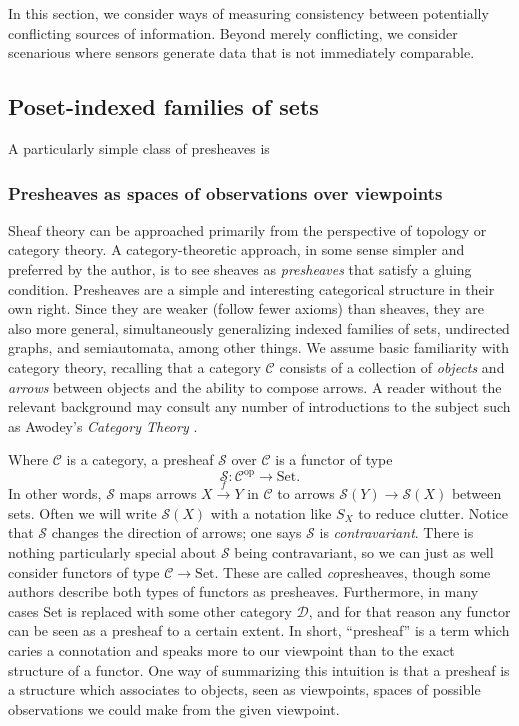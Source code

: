 In this section, we consider ways of measuring consistency between
potentially conflicting sources of information. Beyond merely
conflicting, we consider scenarious where sensors generate data that
is not immediately comparable.

\subsection{Poset-indexed families of sets}

A particularly simple class of presheaves is 



\subsubsection{Presheaves as spaces of observations over viewpoints}

Sheaf theory can be approached primarily from the perspective of topology or category theory. A category-theoretic approach, in some sense simpler and preferred by the author, is to see sheaves as \emph{presheaves} that satisfy a gluing condition. Presheaves are a simple and interesting categorical structure in their own right. Since they are weaker (follow fewer axioms) than sheaves, they are also more general, simultaneously generalizing indexed families of sets, undirected graphs, and semiautomata, among other things. We assume basic familiarity with category theory, recalling that a category $\mathcal{C}$ consists of a collection of \emph{objects} and \emph{arrows} between objects and the ability to compose arrows. A reader without the relevant background may consult any number of introductions to the subject such as Awodey's \emph{Category Theory} \cite{10.5555/2060081}.


Where $\mathcal{C}$ is a category, a presheaf $\mathcal{S}$ over $\mathcal{C}$ is a functor of type
\[ \mathcal{S}: \mathcal{C}^\textrm{op} \to \mathrm{Set}.\]
In other words, $\mathcal{S}$ maps arrows $X \xrightarrow{f} Y$ in $\mathcal{C}$ to arrows $\mathcal{S}(Y) \to \mathcal{S}(X)$ between sets.  Often we will write $\mathcal{S}(X)$ with a notation like $S_X$ to reduce clutter. Notice that $\mathcal{S}$ changes the direction of arrows; one says $\mathcal{S}$ is \emph{contravariant}. There is nothing particularly special about $\mathcal{S}$ being contravariant, so we can just as well consider functors of type $\mathcal{C} \to \mathrm{Set}$. These are called \emph{co}presheaves, though some authors describe both types of functors as presheaves.
Furthermore, in many cases $\mathrm{Set}$ is replaced with some other category $\mathcal{D}$, and for that reason any functor can be seen as a presheaf to a certain extent. In short, ``presheaf'' is a term which caries a connotation and speaks more to our viewpoint than to the exact structure of a functor. One way of summarizing this intuition is that a presheaf is a structure which associates to objects, seen as viewpoints, spaces of possible observations we could make from the given viewpoint.


